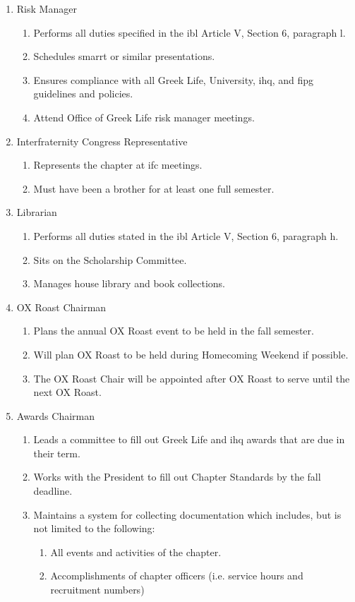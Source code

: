 \begin{enumerate}
				\item Risk Manager
					\begin{enumerate}
						\item Performs all duties specified in the \gls{ibl} Article V, Section 6, paragraph l.
						\item Schedules \gls{smarrt} or similar presentations.
						\item Ensures compliance with all Greek Life, University, \gls{ihq}, and \gls{fipg} guidelines and policies.
						\item Attend Office of Greek Life risk manager meetings.
					\end{enumerate}

				\item Interfraternity Congress Representative
					\begin{enumerate}
						\item Represents the chapter at \gls{ifc} meetings.
						\item Must have been a brother for at least one full semester.
					\end{enumerate}
				
				\item Librarian
				\begin{enumerate}
					\item Performs all duties stated in the \gls{ibl} Article V, Section 6, paragraph h.
					\item Sits on the Scholarship Committee.
					\item Manages house library and book collections.
				\end{enumerate}
				
				\item OX Roast Chairman
					\begin{enumerate}
						\item Plans the annual OX Roast event to be held in the fall semester.
						\item Will plan OX Roast to be held during Homecoming Weekend if possible.
						\item The OX Roast Chair will be appointed after OX Roast to serve until the next OX Roast.
					\end{enumerate}

				\item Awards Chairman
					\begin{enumerate}
						\item Leads a committee to fill out Greek Life and \gls{ihq} awards that are due in their term.
						\item Works with the President to fill out Chapter Standards by the fall deadline.
						\item Maintains a system for collecting documentation which includes, but is not limited to the following:
							\begin{enumerate}
								\item All events and activities of the chapter.
								\item Accomplishments of chapter officers (i.e. service hours and recruitment numbers)
							\end{enumerate}
					\end{enumerate}


\end{enumerate}
